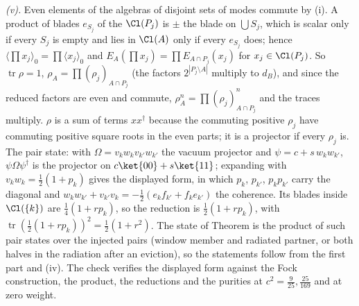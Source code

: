 \emph{(v).} Even elements of the algebras of disjoint sets of modes commute by (i). A product of blades $e_{S_{j}}$ of the $\Cl(P_{j})$ is $\pm$ the blade on $\bigcup S_{j}$, which is scalar only if every $S_{j}$ is empty and lies in $\Cl(A)$ only if every $e_{S_{j}}$ does; hence $\langle\prod x_{j}\rangle_{0} = \prod\langle x_{j}\rangle_{0}$ and $E_{A}(\prod x_{j}) = \prod E_{A \cap P_{j}}(x_{j})$ for $x_{j} \in \Cl(P_{j})$. So $\operatorname{tr}\rho = 1$, $\rho_{A} = \prod(\rho_{j})_{A \cap P_{j}}$ (the factors $2^{|P_{j} \setminus A|}$ multiply to $d_{B}$), and since the reduced factors are even and commute, $\rho_{A}^{n} = \prod(\rho_{j})_{A \cap P_{j}}^{n}$ and the traces multiply. $\rho$ is a sum of terms $xx^{\dagger}$ because the commuting positive $\rho_{j}$ have commuting positive square roots in the even parts; it is a projector if every $\rho_{j}$ is. The pair state: with $\Omega = v_{k}w_{k}v_{k'}w_{k'}$ the vacuum projector and $\psi = c + s\,w_{k}w_{k'}$, $\psi\Omega\psi^{\dagger}$ is the projector on $c\ket{00} + s\ket{11}$; expanding with $v_{k}w_{k} = \tfrac12(1 + p_{k})$ gives the displayed form, in which $p_{k}$, $p_{k'}$, $p_{k}p_{k'}$ carry the diagonal and $w_{k}w_{k'} + v_{k'}v_{k} = -\tfrac12(e_{k}f_{k'} + f_{k}e_{k'})$ the coherence. Its blades inside $\Cl(\{k\})$ are $\tfrac14(1 + rp_{k})$, so the reduction is $\tfrac12(1 + rp_{k})$, with $\operatorname{tr}(\tfrac12(1 + rp_{k}))^{2} = \tfrac12(1 + r^{2})$. The state of Theorem  is the product of such pair states over the injected pairs (window member and radiated partner, or both halves in the radiation after an eviction), so the statements follow from the first part and (iv). The check verifies the displayed form against the Fock construction, the product, the reductions and the purities at $c^{2} = \tfrac{9}{25}, \tfrac{25}{169}$ and at zero weight.

